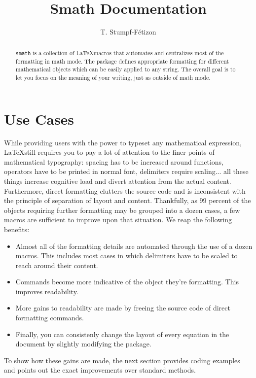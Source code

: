 \documentclass[a4paper,10pt]{scrartcl}
\title{Smath Documentation}
\author{T. Stumpf-Fétizon}
\begin{document}
\maketitle

\begin{abstract}
\texttt{smath} is a collection of \LaTeX macros that automates and centralizes most of the formatting in math mode. The package defines appropriate formatting for different mathematical objects which can be easily applied to any string. The overall goal is to let you focus on the meaning of your writing, just as outside of math mode.
\end{abstract}

\section{Use Cases}
While providing users with the power to typeset any mathematical expression, \LaTeX still requires you to pay a lot of attention to the finer points of mathematical typography: spacing has to be increased around functions, operators have to be printed in normal font, delimiters require scaling... all these things increase cognitive load and divert attention from the actual content. Furthermore, direct formatting clutters the source code and is inconsistent with the principle of separation of layout and content. Thankfully, as 99 percent of the objects requiring further formatting may be grouped into a dozen cases, a few macros are sufficient to improve upon that situation. We reap the following benefits:
\begin{itemize}
  \item Almost all of the formatting details are automated through the use of a dozen macros. This includes most cases in which delimiters have to be scaled to reach around their content.
  \item Commands become more indicative of the object they're formatting. This improves readability.
  \item More gains to readability are made by freeing the source code of direct formatting commands.
  \item Finally, you can consistenly change the layout of every equation in the document by slightly modifying the package.
\end{itemize}
To show how these gains are made, the next section provides coding examples and points out the exact improvements over standard methods.
\end{document}
